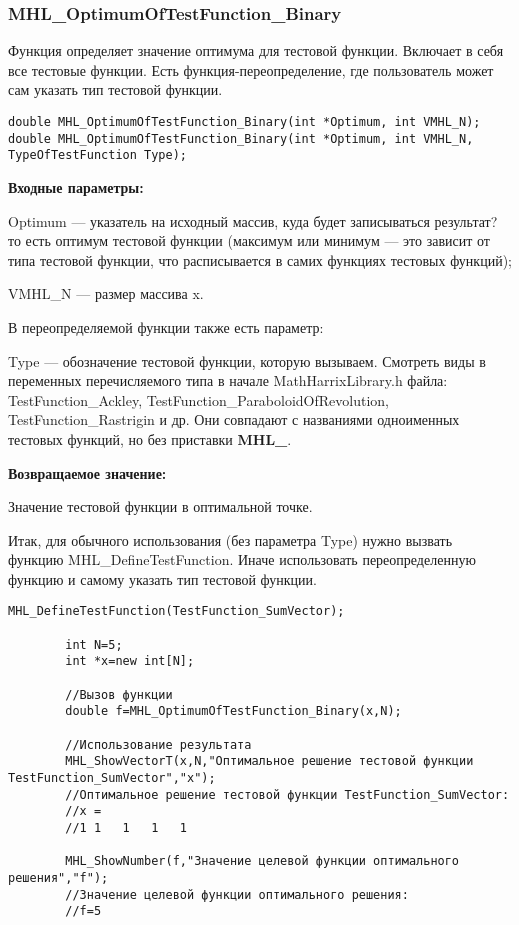 \documentclass[a4paper,12pt]{article}
\begin{document}
\subsubsection{MHL\_OptimumOfTestFunction\_Binary}\label{MHL_OptimumOfTestFunction_Binary}

Функция определяет значение оптимума для тестовой функции. Включает в себя все тестовые функции. Есть функция-переопределение, где пользователь может сам указать тип тестовой функции.


\begin{lstlisting}[label=code_syntax_MHL_OptimumOfTestFunction_Binary,caption=Синтаксис]
double MHL_OptimumOfTestFunction_Binary(int *Optimum, int VMHL_N);
double MHL_OptimumOfTestFunction_Binary(int *Optimum, int VMHL_N, TypeOfTestFunction Type);
\end{lstlisting}

\textbf{Входные параметры:}

Optimum --- указатель на исходный массив, куда будет записываться результат? то есть оптимум тестовой функции (максимум или минимум --- это зависит от типа тестовой функции, что расписывается в самих функциях тестовых функций);

     VMHL\_N --- размер массива x.

В переопределяемой функции также есть параметр:
  
Type --- обозначение тестовой функции, которую вызываем.
Смотреть виды в переменных перечисляемого типа в начале MathHarrixLibrary.h файла: TestFunction\_Ackley, TestFunction\_ParaboloidOfRevolution, TestFunction\_Rastrigin и др. Они совпадают с названиями одноименных тестовых функций, но без приставки \textbf{MHL\_}.

\textbf{Возвращаемое значение:}
 
Значение тестовой функции в оптимальной точке.

Итак, для обычного использования (без параметра Type) нужно вызвать функцию MHL\_DefineTestFunction. Иначе использовать переопределенную функцию и самому указать тип тестовой функции.


\begin{lstlisting}[label=code_use_MHL_OptimumOfTestFunction_Binary,caption=Пример использования]
        MHL_DefineTestFunction(TestFunction_SumVector);

        int N=5;
        int *x=new int[N];

        //Вызов функции
        double f=MHL_OptimumOfTestFunction_Binary(x,N);

        //Использование результата
        MHL_ShowVectorT(x,N,"Оптимальное решение тестовой функции TestFunction_SumVector","x");
        //Оптимальное решение тестовой функции TestFunction_SumVector:
        //x =	
        //1	1	1	1	1

        MHL_ShowNumber(f,"Значение целевой функции оптимального решения","f");
        //Значение целевой функции оптимального решения:
        //f=5
\end{lstlisting}
\end{document}
